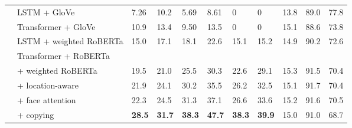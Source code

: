 \begin{table*}[p]
\begin{tabularx}{\textwidth}{llXXXXXX XXX}
      \cmidrule{2-11}
      & LSTM + GloVe & 7.26 & 10.2 & 5.69 & 8.61 & 0 & 0 & 13.8 & 89.0 & 77.8 \\
      & Transformer + GloVe & 10.9 & 13.4 & 9.50 & 13.5 & 0 & 0 & 15.1 & 88.6 & 73.8 \\
      & LSTM + weighted RoBERTa & 15.0 & 17.1 & 18.1 & 22.6 & 15.1 & 15.2 & 14.9 & 90.2 & 72.6 \\
      \cmidrule{2-11}
      & Transformer + RoBERTa \\
      & \quad + weighted RoBERTa & 19.5 & 21.0 & 25.5 & 30.3 & 22.6 & 29.1 & 15.3 & 91.5 & 70.4 \\
      & \quad\quad + location-aware & 21.9 & 24.1 & 30.2 & 35.5 & 26.2 & 32.5 & 15.1 & 91.7 & 70.4  \\
      & \quad\quad\quad + face attention & 22.3 & 24.5 & 31.3 & 37.1 & 26.6 & 33.6 & 15.2 & 91.6 & 70.5 \\
      & \quad\quad\quad\quad + copying & \textbf{28.5} & \textbf{31.7} & \textbf{38.3} & \textbf{47.7} & \textbf{38.3} & \textbf{39.9} & 15.0 & 91.0 & 68.7 \\
		\bottomrule
	\end{tabularx}
\end{table*}

\twocolumn
